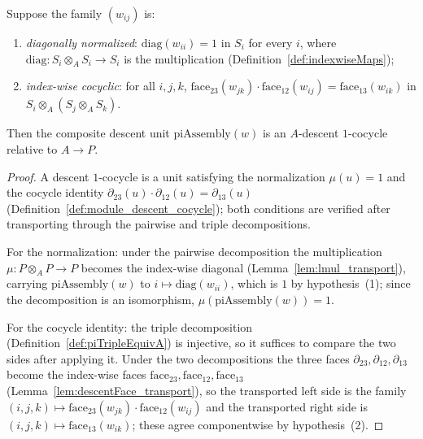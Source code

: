 \begin{theorem}
  \label{thm:isDescentCocycle_piAssemblyUnit}
  \leanok
  Suppose the family \((w_{ij})\) is:
  \begin{enumerate}
    \item \emph{diagonally normalized}: \(\mathrm{diag}(w_{ii}) = 1\) in \(S_i\) for every
      \(i\), where \(\mathrm{diag} \colon S_i \otimes_A S_i \to S_i\) is the multiplication
      (Definition~\ref{def:indexwiseMaps});
    \item \emph{index-wise cocyclic}: for all \(i, j, k\),
      \(\mathrm{face}_{23}(w_{jk}) \cdot \mathrm{face}_{12}(w_{ij}) =
      \mathrm{face}_{13}(w_{ik})\) in \(S_i \otimes_A (S_j \otimes_A S_k)\).
  \end{enumerate}
  Then the composite descent unit \(\mathrm{piAssembly}(w)\) is an \(A\)-descent
  \(1\)-cocycle relative to \(A \to P\).
\end{theorem}
\begin{proof}
  \leanok
  A descent \(1\)-cocycle is a unit satisfying the normalization \(\mu(u) = 1\) and the
  cocycle identity \(\partial_{23}(u) \cdot \partial_{12}(u) = \partial_{13}(u)\)
  (Definition~\ref{def:module_descent_cocycle}); both conditions are verified after
  transporting through the pairwise and triple decompositions.

  For the normalization: under the pairwise decomposition the multiplication
  \(\mu \colon P \otimes_A P \to P\) becomes the index-wise diagonal
  (Lemma~\ref{lem:lmul_transport}), carrying \(\mathrm{piAssembly}(w)\) to
  \(i \mapsto \mathrm{diag}(w_{ii})\), which is \(1\) by hypothesis~(1); since the
  decomposition is an isomorphism, \(\mu(\mathrm{piAssembly}(w)) = 1\).

  For the cocycle identity: the triple decomposition (Definition~\ref{def:piTripleEquivA})
  is injective, so it suffices to compare the two sides after applying it. Under the two
  decompositions the three faces \(\partial_{23}, \partial_{12}, \partial_{13}\) become the
  index-wise faces \(\mathrm{face}_{23}, \mathrm{face}_{12}, \mathrm{face}_{13}\)
  (Lemma~\ref{lem:descentFace_transport}), so the transported left side is the family
  \((i,j,k) \mapsto \mathrm{face}_{23}(w_{jk}) \cdot \mathrm{face}_{12}(w_{ij})\) and the
  transported right side is \((i,j,k) \mapsto \mathrm{face}_{13}(w_{ik})\); these agree
  componentwise by hypothesis~(2).
\end{proof}

